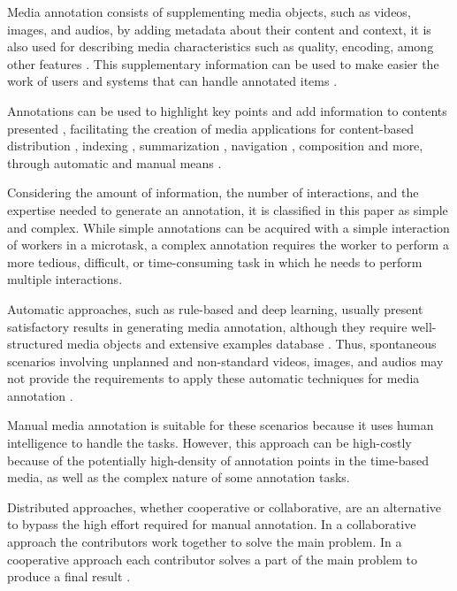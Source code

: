 
Media annotation consists of supplementing media objects, such as videos, images, and audios, by adding metadata about their content and context, it is also used for describing media characteristics such as quality, encoding, among other features \cite{Wang:2009:BDM:1652990.1653002}. This supplementary information can be used to make easier the work of users and systems that can handle annotated items \cite{172450}. 

\pagebreak

Annotations can be used to highlight key points and add information to contents presented \cite{Cunha:2015:MVA:2820426.2820449}, facilitating the creation of media applications for content-based distribution \cite{Zhang:2012:KIE:2339530.2339620}, indexing \cite{Zhang:2007:PRS:1290082.1290126}, summarization \cite{Fiao:2016:AGS:3001773.3001802}, navigation \cite{Goldman:2008}, composition \cite{Wilk:2015:VCC:2713168.2713178} and more, through automatic and manual means \cite{Wang:2011:ALM:1899412.1899414,Mihalcea:2007:WLD:1321440.1321475}. 

Considering the amount of information, the number of interactions, and the expertise needed to generate an annotation, it is classified in this paper as simple and complex. While simple annotations can be acquired with a simple interaction of workers in a microtask, a complex annotation requires the worker to perform a more tedious, difficult, or time-consuming task in which he needs to perform multiple interactions.

Automatic approaches, such as rule-based and deep learning, usually present satisfactory results in generating media annotation, although they require well-structured media objects and extensive examples database \cite{lecun2015deep}. Thus, spontaneous scenarios involving unplanned and non-standard videos, images, and audios may not provide the requirements to apply these automatic techniques for media annotation \cite{murthy2015automatic}. 

Manual media annotation is suitable for these scenarios because it uses human intelligence to handle the tasks. However, this approach can be high-costly because of the potentially high-density of annotation points in the time-based media, as well as the complex nature of some annotation tasks.

Distributed approaches, whether cooperative or collaborative, are an alternative to bypass the high effort required for manual annotation. In a collaborative approach the contributors work together to solve the main problem. In a cooperative approach each contributor solves a part of the main problem to produce a final result  \cite{misanchuk2001building}.

